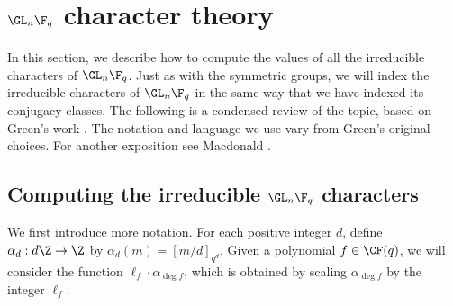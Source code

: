 \section{\texorpdfstring{\(\GL_n \F_q\)}{GLn Fq} character theory}
\label{three}





In this section, we describe how to compute the values of all the irreducible characters of $\GL_n \F_q$.
Just as with the symmetric groups, we will index the irreducible characters of \(\GL_n \F_q\) in the same way that we have indexed its conjugacy classes.
The following is a condensed review of the topic, based on Green's work \cite{green}. The notation and language we use vary from Green's original choices. For another exposition see Macdonald \cite[{Chapter~IV}]{macD}.






\subsection{Computing the irreducible \texorpdfstring{$\GL_n \F_q$}{GLn Fq} characters} \label{char_vals}



We first introduce more notation.
For each positive integer \(d\), define \(\alpha_d : d\Z \to \Z\) by \(\alpha_d (m) = [m/d]_{q^{d}}\).
Given a polynomial \(f \in \CF (q)\), we will consider the function \(\ell_f \cdot \alpha_{\deg f}\), which is obtained by scaling \(\alpha_{\deg f}\) by the integer \(\ell_f\).



